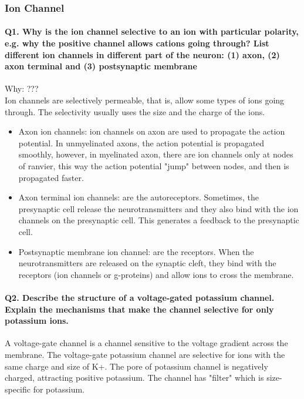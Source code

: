 \documentclass[12pt,article,oneside,a4paper]{memoir}
\begin{document}
\subsubsection{Ion Channel}
\paragraph{Q1. Why is the ion channel selective to an ion with particular polarity, e.g. why the positive channel allows cations going through? List different ion channels in different part of the neuron: (1) axon, (2) axon terminal and (3) postsynaptic membrane}

Why: ??? \\
Ion channels are selectively permeable, that is, allow some types of ions going through. The selectivity usually uses the size and the charge of the ions.

\begin{itemize}
\item Axon ion channels: ion channels on axon are used to propagate the action potential. In unmyelinated axons, the action potential is propagated smoothly, however, in myelinated axon, there are ion channels only at nodes of ranvier, this way the action potential "jump" between nodes, and then is propagated faster.
\item Axon terminal ion channels: are the autoreceptors. Sometimes, the presynaptic cell release the neurotransmitters and they also bind with the ion channels on the presynaptic cell. This generates a feedback to the presynaptic cell.
\item Postsynaptic membrane ion channel: are the receptors. When the neurotransmitters are released on the synaptic cleft, they bind with the receptors (ion channels or g-proteins) and allow ions to cross the membrane.
\end{itemize}

\paragraph{Q2. Describe the structure of a voltage-gated potassium channel. Explain the mechanisms that make the channel selective for only potassium ions.}
A voltage-gate channel is a channel sensitive to the voltage gradient across the membrane. The voltage-gate potassium channel are selective for ions with the same charge and size of K+. The pore of potassium channel is negatively charged, attracting positive potassium. The channel has "filter" which is size-specific for potassium.
\end{document}

